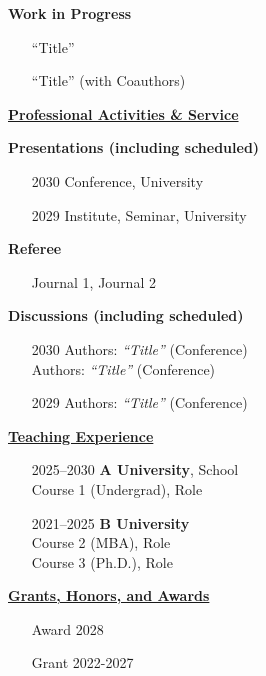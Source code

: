 \documentclass[11pt]{article}
\newcommand{\cvsection}[1]{%
    \vspace{1em}%
    \noindent\textbf{\uline{#1}}%
    \vspace{0.5em}%
}
\begin{document}
\noindent\textbf{Work in Progress}
\begin{itemize}[leftmargin=1em, labelwidth=0em, labelsep=0em, itemindent=0em, align=left]
    \item[] ``Title''
    \item[] ``Title'' (with Coauthors)
\end{itemize}

\cvsection{Professional Activities \& Service}

\noindent\textbf{Presentations (including scheduled)}
\begin{itemize}[leftmargin=4em, labelwidth=2em, labelsep=1em, itemindent=0em, align=left]
    \item[2030] Conference, University
    \item[2029] Institute, Seminar, University
\end{itemize}

\noindent\textbf{Referee}
\begin{itemize}[leftmargin=4em, labelwidth=2em, labelsep=1em, itemindent=0em, align=left]
    \item[] Journal 1, Journal 2
\end{itemize}

\noindent\textbf{Discussions (including scheduled)}
\begin{itemize}[leftmargin=4em, labelwidth=2em, labelsep=1em, itemindent=0em, align=left]
    \item[2030] Authors: \textit{``Title''} (Conference) \\
                Authors: \textit{``Title''} (Conference)
    \item[2029] Authors: \textit{``Title''} (Conference)
\end{itemize}

\cvsection{Teaching Experience}
\begin{itemize}[leftmargin=7em, labelwidth=5em, labelsep=1em, itemindent=0em, align=left]
    \item[2025–2030] \textbf{A University}, School\\
                      Course 1 (Undergrad), Role
    \item[2021–2025] \textbf{B University}\\
                      Course 2 (MBA), Role \\
                      Course 3 (Ph.D.), Role
\end{itemize}

\cvsection{Grants, Honors, and Awards}
\begin{itemize}[leftmargin=1em, labelwidth=0em, labelsep=0em, itemindent=0em, align=left]
    \item[] Award \hfill 2028
    \item[] Grant \hfill 2022-2027
\end{itemize}
\end{document}
